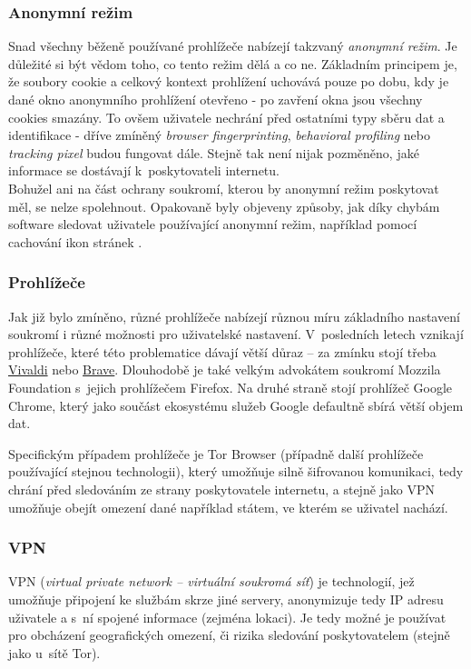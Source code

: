 \subsubsection*{Anonymní režim}
Snad všechny běženě používané prohlížeče nabízejí takzvaný \textit{anonymní režim}. Je důležité si být vědom toho, co tento režim dělá a co ne.
Základním principem je, že soubory cookie a celkový kontext prohlížení uchovává pouze po dobu, kdy je dané okno anonymního prohlížení otevřeno - po zavření okna jsou všechny cookies smazány. To ovšem uživatele nechrání před ostatními typy sběru dat a identifikace - dříve zmíněný \textit{browser fingerprinting}, \textit{behavioral profiling} nebo \textit{tracking pixel} budou fungovat dále. Stejně tak není nijak pozměněno, jaké informace se dostávají k~poskytovateli internetu.\\

Bohužel ani na část ochrany soukromí, kterou by anonymní režim poskytovat měl, se nelze spolehnout. Opakovaně byly objeveny způsoby, jak díky chybám software sledovat uživatele používající anonymní režim, například pomocí cachování ikon stránek \citep{incognito-tracking}.

\subsubsection*{Prohlížeče}
Jak již bylo zmíněno, různé prohlížeče nabízejí různou míru základního nastavení soukromí i různé možnosti pro uživatelské nastavení.
V~posledních letech vznikají prohlížeče, které této problematice dávají větší důraz -- za zmínku stojí třeba \href{https://vivaldi.com}{Vivaldi} nebo \href{https://brave.com}{Brave}. Dlouhodobě je také velkým advokátem soukromí Mozzila Foundation s~jejich prohlížečem Firefox.
Na druhé straně stojí prohlížeč Google Chrome, který jako součást ekosystému služeb Google defaultně sbírá větší objem dat.


Specifickým případem prohlížeče je Tor Browser (případně další prohlížeče používající stejnou technologii), který umožňuje silně šifrovanou komunikaci, tedy chrání před sledováním ze strany poskytovatele internetu, a stejně jako VPN umožňuje obejít omezení dané například státem, ve kterém se uživatel nachází.  

\subsubsection*{VPN}
VPN (\textit{virtual private network -- virtuální soukromá síť}) je technologií, jež umožňuje připojení ke službám skrze jiné servery, anonymizuje tedy IP adresu uživatele a s~ní spojené informace (zejména lokaci). Je tedy možné je používat pro obcházení geografických omezení, či rizika sledování poskytovatelem (stejně jako u~sítě Tor).

